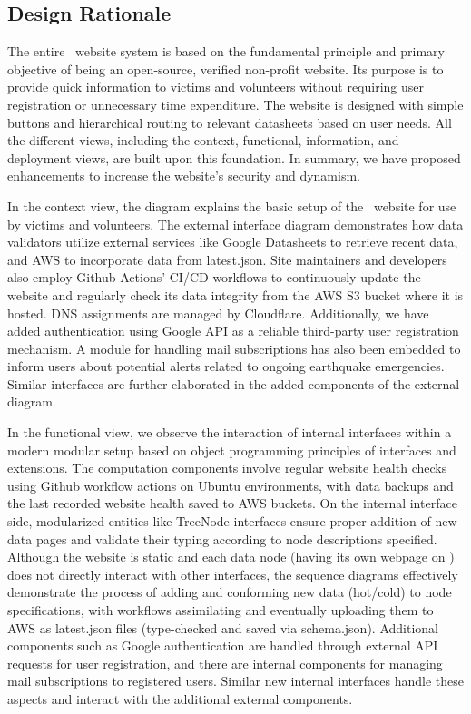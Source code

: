 \subsection{Design Rationale}

The entire \afetbilgi\ website system is based on the fundamental principle and primary objective of being an open-source, verified non-profit website. Its purpose is to provide quick information to victims and volunteers without requiring user registration or unnecessary time expenditure. The website is designed with simple buttons and hierarchical routing to relevant datasheets based on user needs. All the different views, including the context, functional, information, and deployment views, are built upon this foundation. In summary, we have proposed enhancements to increase the website's security and dynamism.

In the context view, the diagram explains the basic setup of the \afetbilgi\ website for use by victims and volunteers. The external interface diagram demonstrates how data validators utilize external services like Google Datasheets to retrieve recent data, and AWS to incorporate data from latest.json. Site maintainers and developers also employ Github Actions' CI/CD workflows to continuously update the website and regularly check its data integrity from the AWS S3 bucket where it is hosted. DNS assignments are managed by Cloudflare. Additionally, we have added authentication using Google API as a reliable third-party user registration mechanism. A module for handling mail subscriptions has also been embedded to inform users about potential alerts related to ongoing earthquake emergencies. Similar interfaces are further elaborated in the added components of the external diagram.

In the functional view, we observe the interaction of internal interfaces within a modern modular setup based on object programming principles of interfaces and extensions. The computation components involve regular website health checks using Github workflow actions on Ubuntu environments, with data backups and the last recorded website health saved to AWS buckets. On the internal interface side, modularized entities like TreeNode interfaces ensure proper addition of new data pages and validate their typing according to node descriptions specified. Although the website is static and each data node (having its own webpage on \afetbilgi) does not directly interact with other interfaces, the sequence diagrams effectively demonstrate the process of adding and conforming new data (hot/cold) to node specifications, with workflows assimilating and eventually uploading them to AWS as latest.json files (type-checked and saved via schema.json). Additional components such as Google authentication are handled through external API requests for user registration, and there are internal components for managing mail subscriptions to registered users. Similar new internal interfaces handle these aspects and interact with the additional external components.

